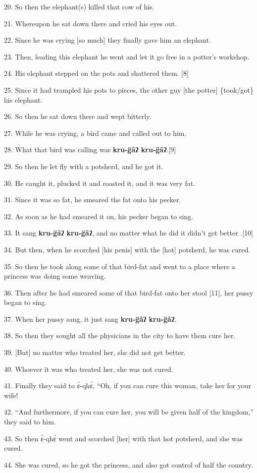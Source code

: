 {\Large{}20. So then the elephant(s) killed that cow of his.}

{\Large{}21. Whereupon he sat down there and cried his eyes out.}

{\Large{}22. Since he was crying [so much] they finally gave him an elephant.}

{\Large{}23. Then, leading this elephant he went and let it go free in a potter's
workshop.}

{\Large{}24. His elephant stepped on the pots and shattered them. [8]}

{\Large{}25. Since it had trampled his pots to pieces, the other guy [the potter]
\{took/got\} his elephant.}

{\Large{}26. So then he sat down there and wept bitterly.}

{\Large{}27. While he was crying, a bird came and called out to him.}

{\Large{}28. What that bird was calling was }{\Large{}\textbf{kru-g̈âʔ kru-g̈âʔ}}{\Large{}.[9]}

{\Large{}29. So then he let fly with a potsherd, and he got it.}

{\Large{}30. He caught it, plucked it and roasted it, and it was very fat.}

{\Large{}31. Since it was so fat, he smeared the fat onto his pecker.}

{\Large{}32. As soon as he had smeared it on, his pecker began to sing.}

{\Large{}33. It sang }{\Large{}\textbf{kru-g̈âʔ kru-g̈âʔ}}{\Large{}, and
no matter what he did it didn't get better .[10]}

{\Large{}34. But then, when he scorched [his penis] with the [hot] potsherd, he
was cured.}

{\Large{}35. So then he took along some of that bird-fat and went to a place where
a princess was doing some weaving.}

{\Large{}36. Then after he had smeared some of that bird-fat onto her stool [11],
her pussy began to sing.}

{\Large{}37. When her pussy sang, it just sang }{\Large{}\textbf{kru-g̈âʔ kru-g̈âʔ}}{\Large{}.}

{\Large{}38. So then they sought all the physicians in the city to have them cure
her.}

{\Large{}39. [But] no matter who treated her, she did not get better.}

{\Large{}40. Whoever it was who treated her, she was not cured.}

{\Large{}41. Finally they said to ɛ̀-qhɛ̀, ``Oh, if you can cure this woman,
take her for your wife!}

{\Large{}42. ``And furthermore, if you can cure her, you will be given half of
the kingdom,'' they said to him.}

{\Large{}43. So then ɛ̀-qhɛ̀ went and scorched [her] with that hot potsherd,
and she was cured.}

{\Large{}44. She was cured, so he got the princess, and also got control of half
the country.}

